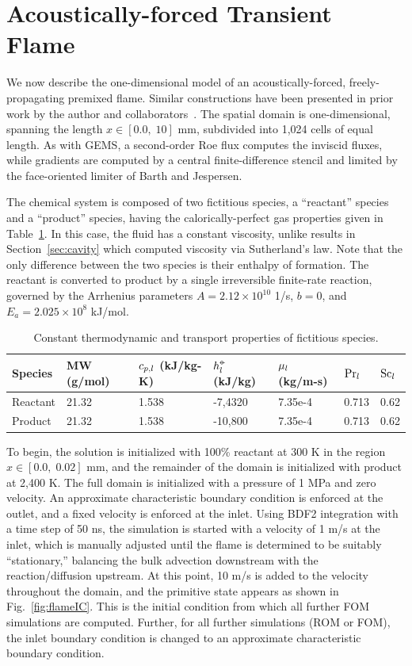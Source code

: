 \section{Acoustically-forced Transient Flame}\label{sec:oneDFlame}

We now describe the one-dimensional model of an acoustically-forced, freely-propagating premixed flame. Similar constructions have been presented in prior work by the author and collaborators~\cite{Huang2022,Wentland2019}. The spatial domain is one-dimensional, spanning the length $x \in [0.0, \; 10]$ mm, subdivided into 1,024 cells of equal length. As with GEMS, a second-order Roe flux computes the inviscid fluxes, while gradients are computed by a central finite-difference stencil and limited by the face-oriented limiter of Barth and Jespersen.

The chemical system is composed of two fictitious species, a ``reactant'' species and a ``product'' species, having the calorically-perfect gas properties given in Table~\ref{tab:oneDFlameSpecs}. In this case, the fluid has a constant viscosity, unlike results in Section~\ref{sec:cavity} which computed viscosity via Sutherland's law. Note that the only difference between the two species is their enthalpy of formation. The reactant is converted to product by a single irreversible finite-rate reaction, governed by the Arrhenius parameters $A = 2.12 \times 10^{10}$ 1/s, $b = 0$, and $E_a = 2.025 \times 10^{8}$ kJ/mol.

\begin{table}
	\centering
	\begin{tabular}{ lllllll }
	\toprule
	Species & MW (g/mol) & $c_{p,l}$ (kJ/kg-K) & $h^{\circ\kern-0.47em-}_{l}$ (kJ/kg) & $\mu_{l}$ (kg/m-s) & $\text{Pr}_{l}$ & $\text{Sc}_{l}$   \\
	\midrule
	Reactant & 21.32 & 1.538 & -7,4320 & 7.35e-4 & 0.713 & 0.62 \\
	Product & 21.32 & 1.538 & -10,800 & 7.35e-4 & 0.713 & 0.62 \\
	\bottomrule
	\end{tabular}
	\caption{\label{tab:oneDFlameSpecs}Constant thermodynamic and transport properties of fictitious species.}
\end{table}

To begin, the solution is initialized with 100\% reactant at 300 K in the region $x \in [0.0, \; 0.02]$ mm, and the remainder of the domain is initialized with product at 2,400 K. The full domain is initialized with a pressure of 1 MPa and zero velocity. An approximate characteristic boundary condition is enforced at the outlet, and a fixed velocity is enforced at the inlet. Using BDF2 integration with a time step of 50 ns, the simulation is started with a velocity of 1 m/s at the inlet, which is manually adjusted until the flame is determined to be suitably ``stationary,'' balancing the bulk advection downstream with the reaction/diffusion upstream. At this point, 10 m/s is added to the velocity throughout the domain, and the primitive state appears as shown in Fig.~\ref{fig:flameIC}. This is the initial condition from which all further FOM simulations are computed. Further, for all further simulations (ROM or FOM), the inlet boundary condition is changed to an approximate characteristic boundary condition.

